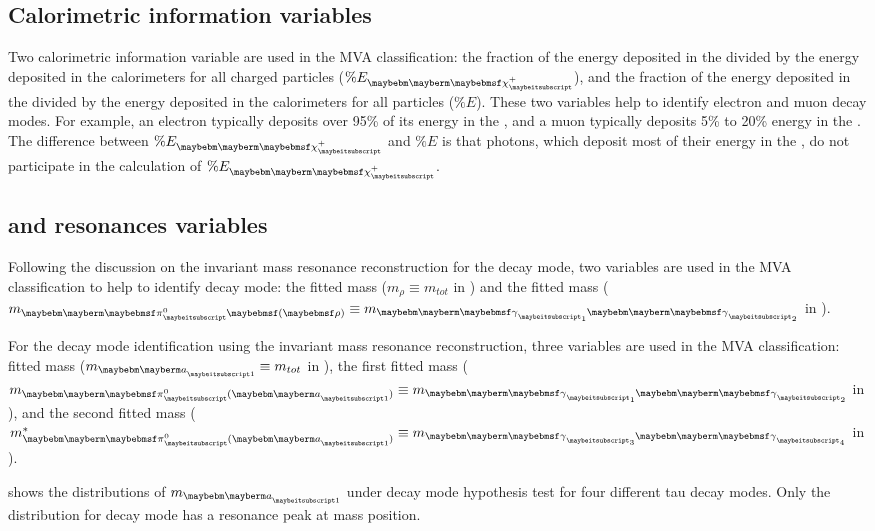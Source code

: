 \subsection{Calorimetric information variables}


Two calorimetric information variable are used in the MVA classification: the fraction of the energy  deposited in the \ECAL divided by the  energy deposited in the calorimeters for all charged particles ($\% E_{\charge}$), and the fraction of the energy  deposited in the \ECAL divided by the  energy deposited in the calorimeters for all particles ($\% E$). These  two variables help to identify electron and muon decay modes. For example, an electron typically deposits over 95\% of its energy in the \ECAL, and a muon typically deposits 5\% to 20\% energy in the \ECAL. The difference between $\% E_{\charge}$ and  $\% E$ is that photons, which deposit most of their energy in the \ECAL, do not participate in the calculation of $\% E_{\charge}$.

\subsection{\texorpdfstring{\decayRhoShort and \decayAiPhotonShort} \, resonances variables}

Following the discussion on the \Prho invariant mass resonance reconstruction for the \decayRhoShort  decay mode,  two variables are used in the MVA classification to help to identify  \decayRhoShort  decay mode: the fitted \Prho mass ($m_\rho \equiv m_{tot}$ in ) and the fitted \Ppizero mass ($m_{\Pgpz\parenths{\rho}} \equiv m_{\Pphoton_1\Pphoton_2}$ in  ).

For the \decayAiPhotonShort decay mode identification using the \Pai invariant mass resonance reconstruction, three variables are used in the MVA classification:  fitted \Pai mass ($m_{\Pai} \equiv m_{tot}$ in ), the first fitted \Ppizero mass ($m_{\Pgpz(\Pai)} \equiv m_{\Pphoton_1\Pphoton_2}$ in ), and the second fitted \Ppizero mass ($m^*_{\Pgpz(\Pai)} \equiv  m_{\Pphoton_3\Pphoton_4}$ in ).

  shows the distributions of  $m_{\Pai}$ under \decayAiPhotonShort decay mode hypothesis test for four different tau decay modes. Only the distribution for \decayAiPhotonShort decay mode has a resonance peak at \Pai mass position.


